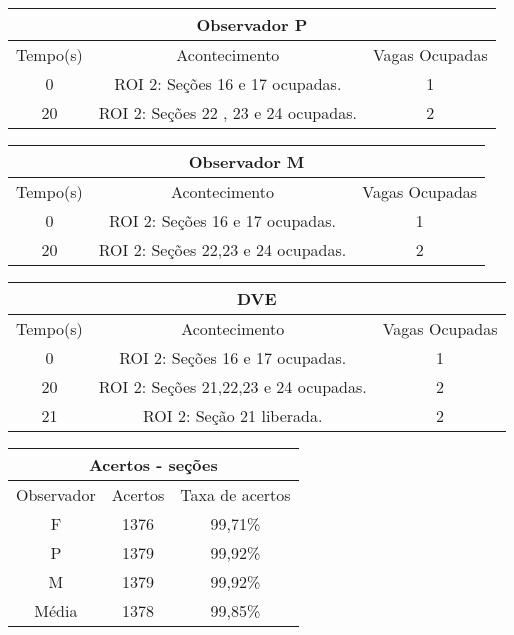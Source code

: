 \begin{center}
\begin{tabular}{|c||c||c|}
\hline
\multicolumn{3}{|c|}{Observador P}  \\ \hline \hline
Tempo(s) & Acontecimento & Vagas Ocupadas\\ \hline
0 & ROI 2: Seções 16 e 17 ocupadas. & 1 \\ \hline
20 & ROI 2: Seções 22 , 23 e 24 ocupadas. & 2 \\
\hline
\end{tabular}
\end{center}

\begin{center}
\begin{tabular}{|c||c||c|}
\hline
\multicolumn{3}{|c|}{Observador M}  \\ \hline \hline
Tempo(s) & Acontecimento & Vagas Ocupadas\\ \hline
0 & ROI 2: Seções 16 e 17 ocupadas. & 1 \\ \hline
20 & ROI 2: Seções 22,23 e 24 ocupadas. & 2 \\
\hline
\end{tabular}
\end{center}

\begin{center}
\begin{tabular}{|c||c||c|}
\hline
\multicolumn{3}{|c|}{DVE}  \\ \hline \hline
Tempo(s) & Acontecimento & Vagas Ocupadas\\ \hline
0 & ROI 2: Seções 16 e 17 ocupadas. & 1 \\ \hline
20 & ROI 2: Seções 21,22,23 e 24 ocupadas. & 2 \\ \hline
21 & ROI 2: Seção 21 liberada. & 2 \\
\hline
\end{tabular}
\end{center}

\begin{center}
\begin{tabular}{|c||c||c|}
\hline
\multicolumn{3}{|c|}{Acertos - seções}  \\ \hline\hline
Observador & Acertos & Taxa de acertos \\ \hline
F & 1376 & 99,71\% \\  \hline
P & 1379 & 99,92\% \\ \hline
M & 1379 & 99,92\% \\ \hline
Média & 1378 & 99,85\% \\
\hline
\end{tabular}
\end{center}


